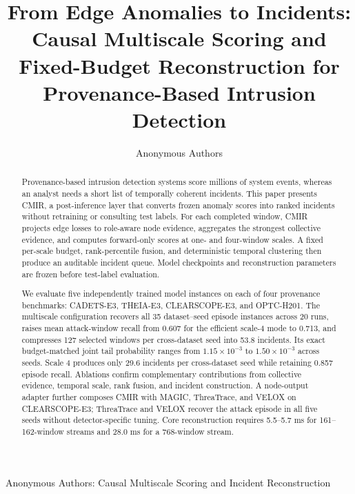 \documentclass[lettersize,journal]{IEEEtran}
\newcommand{\method}{CMIR}
\begin{document}
\title{From Edge Anomalies to Incidents: Causal Multiscale Scoring and Fixed-Budget Reconstruction for Provenance-Based Intrusion Detection}

\author{Anonymous Authors}

%
{Anonymous Authors: Causal Multiscale Scoring and Incident Reconstruction}

\maketitle

\begin{abstract}
Provenance-based intrusion detection systems score millions of system events,
whereas an analyst needs a short list of temporally coherent incidents.  This
paper presents \method{}, a post-inference layer that converts frozen anomaly
scores into ranked incidents without retraining or consulting test labels.
For each completed window, \method{} projects edge losses to role-aware node
evidence, aggregates the strongest collective evidence, and computes
forward-only scores at one- and four-window scales.  A fixed per-scale budget,
rank-percentile fusion, and deterministic temporal clustering then produce an
auditable incident queue.  Model checkpoints and reconstruction parameters are
frozen before test-label evaluation.

We evaluate five independently trained model instances on each of four
provenance benchmarks: CADETS-E3, THEIA-E3, CLEARSCOPE-E3, and OPTC-H201.  The
multiscale configuration recovers all 35 dataset--seed episode instances across
20 runs, raises mean attack-window recall from 0.607 for the efficient scale-4
mode to 0.713, and compresses 127 selected windows per cross-dataset seed into
53.8 incidents.  Its exact budget-matched joint tail probability ranges from
$1.15\!\times\!10^{-3}$ to $1.50\!\times\!10^{-3}$ across seeds.  Scale 4
produces only 29.6 incidents per cross-dataset seed while retaining 0.857
episode recall.  Ablations confirm complementary contributions from collective
evidence, temporal scale, rank fusion, and incident construction.  A node-output
adapter further composes \method{} with MAGIC, ThreaTrace, and VELOX on
CLEARSCOPE-E3; ThreaTrace and VELOX recover the attack episode in all five
seeds without detector-specific tuning.  Core reconstruction requires
5.5--5.7 ms for 161--162-window streams and 28.0 ms for a 768-window stream.
\end{abstract}
\end{document}
